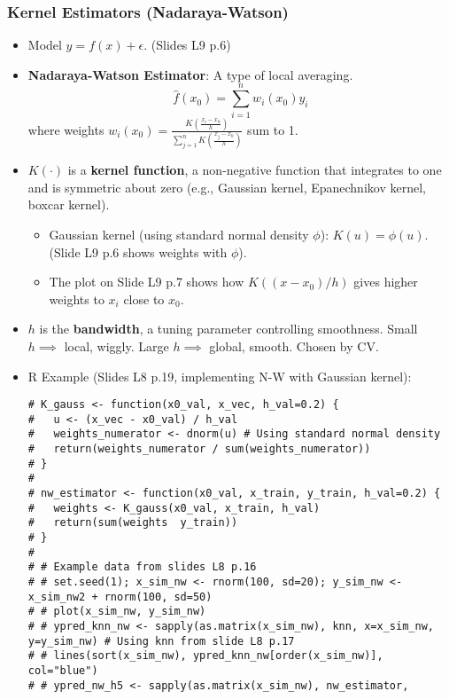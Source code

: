 \documentclass[12pt,a4paper]{article}
\begin{document}
\begin{itemize}
    \subsubsection{Kernel Estimators (Nadaraya-Watson)}
        \begin{itemize}
            \item Model $y = f(x) + \epsilon$. (Slides L9 p.6)
            \item \textbf{Nadaraya-Watson Estimator}: A type of local averaging.
                $$ \hat{f}(x_0) = \sum_{i=1}^n w_i(x_0) y_i $$
                where weights $w_i(x_0) = \frac{K\left(\frac{x_i - x_0}{h}\right)}{\sum_{j=1}^n K\left(\frac{x_j - x_0}{h}\right)}$ sum to 1.
            \item $K(\cdot)$ is a \textbf{kernel function}, a non-negative function that integrates to one and is symmetric about zero (e.g., Gaussian kernel, Epanechnikov kernel, boxcar kernel).
                \begin{itemize}
                    \item Gaussian kernel (using standard normal density $\phi$): $K(u) = \phi(u)$. (Slide L9 p.6 shows weights with $\phi$).
                    \item The plot on Slide L9 p.7 shows how $K((x-x_0)/h)$ gives higher weights to $x_i$ close to $x_0$.
                \end{itemize}
            \item $h$ is the \textbf{bandwidth}, a tuning parameter controlling smoothness. Small $h \implies$ local, wiggly. Large $h \implies$ global, smooth. Chosen by CV.
            \item R Example (Slides L8 p.19, implementing N-W with Gaussian kernel):
\begin{lstlisting}[caption={Nadaraya-Watson with Gaussian Kernel (Slides L8 p.19)}]
# K_gauss <- function(x0_val, x_vec, h_val=0.2) {
#   u <- (x_vec - x0_val) / h_val
#   weights_numerator <- dnorm(u) # Using standard normal density
#   return(weights_numerator / sum(weights_numerator))
# }
# 
# nw_estimator <- function(x0_val, x_train, y_train, h_val=0.2) {
#   weights <- K_gauss(x0_val, x_train, h_val)
#   return(sum(weights  y_train))
# }
# 
# # Example data from slides L8 p.16
# # set.seed(1); x_sim_nw <- rnorm(100, sd=20); y_sim_nw <- x_sim_nw2 + rnorm(100, sd=50)
# # plot(x_sim_nw, y_sim_nw)
# # ypred_knn_nw <- sapply(as.matrix(x_sim_nw), knn, x=x_sim_nw, y=y_sim_nw) # Using knn from slide L8 p.17
# # lines(sort(x_sim_nw), ypred_knn_nw[order(x_sim_nw)], col="blue")
# # ypred_nw_h5 <- sapply(as.matrix(x_sim_nw), nw_estimator, 

\end{lstlisting}
\end{itemize}
\end{itemize}
\end{document}
